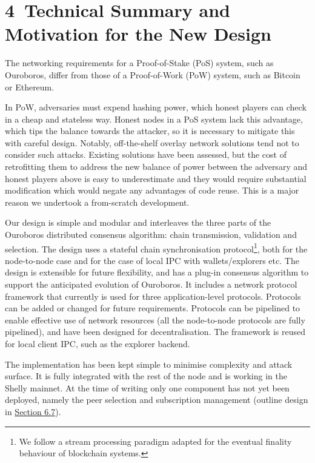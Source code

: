 \documentclass[11pt,a4paper]{article}
\begin{document}
\hypertarget{technical-summary-and-motivation-for-the-new-design}{%
\section{​4​~Technical Summary and Motivation for the New
Design}\label{technical-summary-and-motivation-for-the-new-design}}

The networking requirements for a Proof-of-Stake (PoS) system, such as
Ouroboros, differ from those of a Proof-of-Work (PoW) system, such as
Bitcoin or Ethereum.

In PoW, adversaries must expend hashing power, which honest players can
check in a cheap and stateless way. Honest nodes in a PoS system lack
this advantage, which tips the balance towards the attacker, so it is
necessary to mitigate this with careful design. Notably, off-the-shelf
overlay network solutions tend not to consider such attacks. Existing
solutions have been assessed, but the cost of retrofitting them to
address the new balance of power between the adversary and honest
players above is easy to underestimate and they would require
substantial modification which would negate any advantages of code
reuse. This is a major reason we undertook a from-scratch development.

Our design is simple and modular and interleaves the three parts of the
Ouroboros distributed consensus algorithm: chain transmission,
validation and selection. The design uses a stateful chain
synchronisation protocol\footnote{We follow a stream processing paradigm
  adapted for the eventual finality behaviour of blockchain systems.},
both for the node-to-node case and for the case of local IPC with
wallets/explorers etc. The design is extensible for future flexibility,
and has a plug-in consensus algorithm to support the anticipated
evolution of Ouroboros. It includes a network protocol framework that
currently is used for three application-level protocols. Protocols can
be added or changed for future requirements. Protocols can be pipelined
to enable effective use of network resources (all the node-to-node
protocols are fully pipelined), and have been designed for
decentralisation. The framework is reused for local client IPC, such as
the explorer backend.

The implementation has been kept simple to minimise complexity and
attack surface. It is fully integrated with the rest of the node and is
working in the Shelly mainnet. At the time of writing only one component
has not yet been deployed, namely the peer selection and subscription
management (outline design in
\protect\hyperlink{decentralisation-design}{{Section 6.7}}).
\end{document}
